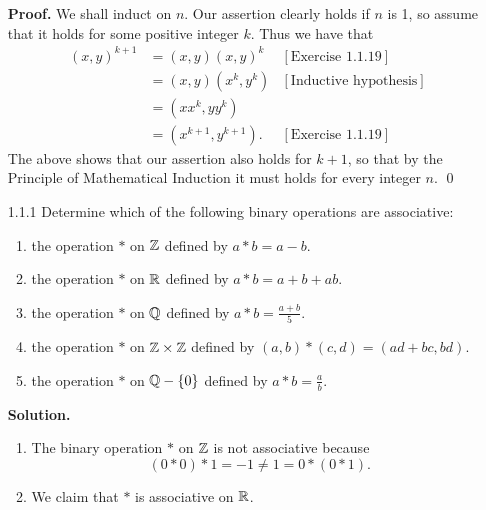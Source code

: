 \begin{enumerate}
      \textbf{Proof.} We shall induct on $n$. Our assertion clearly holds if
      $n$ is 1, so assume that it holds for some positive integer $k$. Thus we
      have that
      \begin{align*}
         (x, y)^{k+1} &= (x, y)(x, y)^k &[\text{Exercise 1.1.19}] \\
                      &= (x, y)(x^k, y^k) &[\text{Inductive hypothesis}] \\
                      &= (xx^k, yy^k) \\
                      &= (x^{k+1}, y^{k+1}). &[\text{Exercise 1.1.19}]
      \end{align*}
      The above shows that our assertion also holds for $k + 1$, so that by
      the Principle of Mathematical Induction it must holds for every integer
      $n$. \qed
   \item[1.1.1]   Determine which of the following binary operations are
                  associative:
                  \begin{enumerate}
                     \item the operation $*$ on $\mathbb{Z}$ defined by $a * b = a - b$.
                     \item the operation $*$ on $\mathbb{R}$ defined by
                           $a * b = a + b + ab$.
                     \item the operation $*$ on $\mathbb{Q}$ defined by
                           $\displaystyle a * b = \frac{a + b}{5}$.
                     \item the operation $*$ on $\mathbb{Z} \times \mathbb{Z}$ defined by
                           $(a, b) * (c, d) = (ad + bc, bd)$.
                     \item the operation $*$ on $\mathbb{Q} - \{0\}$ defined by
                           $\displaystyle a * b = \frac{a}{b}$.
                  \end{enumerate}
                  
      \textbf{Solution.}
   
      \begin{enumerate}
         \item The binary operation $*$ on $\mathbb{Z}$ is not associative because
               $$(0 * 0) * 1 = -1 \neq 1 = 0 * (0 * 1).$$
         \item We claim that $*$ is associative on $\mathbb{R}$.
      

\end{enumerate}
\end{enumerate}
